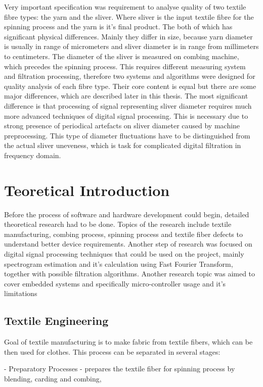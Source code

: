 \documentclass[twoside]{ctuthesis}
\theoremstyle{plain}
\theoremstyle{definition}
\theoremstyle{note}
\begin{document}
Very important specification was requirement to analyse quality of two textile fibre types: the  yarn and the sliver. Where sliver is the input textile fibre for the spinning process and the yarn is it's final product. The both of which has significant physical differences. Mainly they differ in size, because yarn diameter is usually in range of micrometers and sliver diameter is in range from millimeters to centimeters. The diameter of the sliver is measured on combing machine, which precedes the spinning process. This requires different measuring system and filtration processing, therefore two systems and algorithms were designed for quality analysis of each fibre type. Their core content is equal but there are some major differences, which are described later in this thesis. The most significant difference is that processing of signal representing sliver diameter requires much more advanced techniques of digital signal processing. This is necessary due to strong presence of periodical artefacts on sliver diameter caused by machine preprocessing. This type of diameter fluctuations have to be distinguished from the actual sliver uneveness, which is task for complicated digital filtration in frequency domain.

\chapter{Teoretical Introduction}
Before the process of software and hardware development could begin, detailed theoretical research had to be done. Topics of the research include textile manufacturing, combing process, spinning process and textile fiber defects to understand better device requirements. Another step of research was focused on digital signal processing techniques that could be used on the project, mainly spectrogram estimation and it's calculation using Fast Fourier Transform, together with possible filtration algorithms. Another research topic was aimed to cover embedded systems and specifically micro-controller usage and it's limitations
\section{Textile Engineering}
Goal of textile manufacturing is to make fabric from textile fibers, which can be then used for clothes. This process can be separated in several stages:

- Preparatory Processes - prepares the textile fiber for spinning process by blending, carding and combing,
\end{document}
